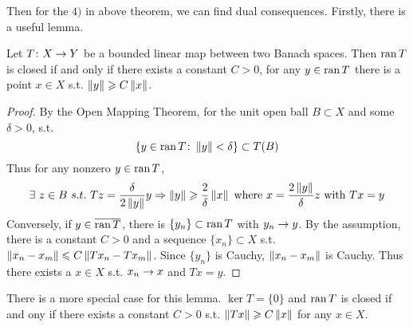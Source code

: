 \documentclass[a4paper,11pt]{report}
\begin{document}
Then for the $4)$ in above theorem, we can find dual consequences. Firstly, there is a useful lemma.

\begin{lem}
	Let $T \colon X \rightarrow Y$ be a bounded linear map between two Banach spaces. Then $\operatorname{ran}{T}$ is closed if and only if there exists a constant $C>0$, for any $y \in \operatorname{ran}{T}$ there is a point $x \in X$ s.t. $\left\lVert y\right\lVert \geqslant C \left\lVert x\right\lVert$.
\end{lem}
\begin{proof}
	By the Open Mapping Theorem, for the unit open ball $B \subset X$ and some $\delta > 0$, s.t.
	\begin{equation*}
		\{y \in \operatorname{ran}{T} \colon \left\lVert y\right\lVert < \delta\} \subset T(B)
	\end{equation*}
	Thus for any nonzero $y \in \operatorname{ran}{T}$,
	\begin{equation*}
		\exists~ z \in B ~s.t.~ Tz = \frac{\delta}{2\left\lVert y\right\lVert}y \Rightarrow \left\lVert y\right\lVert \geqslant \frac{2}{\delta}\left\lVert x\right\lVert \text{~where~} x = \frac{2\left\lVert y\right\lVert}{\delta} z \text{~with~} Tx = y
	\end{equation*}
	Conversely, if $y \in \overline{\operatorname{ran}{T}}$, there is $\{y_n\} \subset \operatorname{ran}{T}$ with $y_n \rightarrow y$. By the assumption, there is a constant $C>0$ and a sequence $\{x_n\} \subset X$ s.t. $\left\lVert x_n-x_m\right\lVert \leqslant C\left\lVert Tx_n-Tx_m\right\lVert$. Since $\{y_n\}$ is Cauchy, $\left\lVert x_n-x_m\right\lVert$ is Cauchy. Thus there exists a $x \in X$ s.t. $x_n \rightarrow x$ and $Tx=y$.
\end{proof}
\begin{rem}
	There is a more special case for this lemma. $\ker{T}=\{0\}$ and $\operatorname{ran}{T}$ is closed if and ony if there exists a constant $C>0$ s.t. $\left\lVert Tx\right\lVert \geqslant C\left\lVert x\right\lVert$ for any $x \in X$.
\end{rem}
\end{document}
